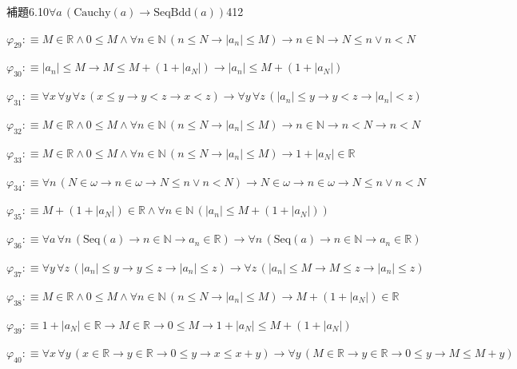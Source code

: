 \begin{fullproof}{補題6.10}{$\forall a\,(\mathrm{Cauchy}(a) \to \mathrm{SeqBdd}(a))$}{412}
\begin{abbrevlist}
\item $\varphi_{29} :\equiv M \in \mathbb{R} \land 0 \leq M \land \forall n \in \mathbb{N}\,(n \leq N \to \lvert a_{n} \rvert \leq M) \to n \in \mathbb{N} \to N \leq n \lor n < N$
\item $\varphi_{30} :\equiv \lvert a_{n} \rvert \leq M \to M \leq M + (1 + \lvert a_{N} \rvert) \to \lvert a_{n} \rvert \leq M + (1 + \lvert a_{N} \rvert)$
\item $\varphi_{31} :\equiv \forall x\,\forall y\,\forall z\,(x \leq y \to y < z \to x < z) \to \forall y\,\forall z\,(\lvert a_{n} \rvert \leq y \to y < z \to \lvert a_{n} \rvert < z)$
\item $\varphi_{32} :\equiv M \in \mathbb{R} \land 0 \leq M \land \forall n \in \mathbb{N}\,(n \leq N \to \lvert a_{n} \rvert \leq M) \to n \in \mathbb{N} \to n < N \to n < N$
\item $\varphi_{33} :\equiv M \in \mathbb{R} \land 0 \leq M \land \forall n \in \mathbb{N}\,(n \leq N \to \lvert a_{n} \rvert \leq M) \to 1 + \lvert a_{N} \rvert \in \mathbb{R}$
\item $\varphi_{34} :\equiv \forall n\,(N \in \omega \to n \in \omega \to N \leq n \lor n < N) \to N \in \omega \to n \in \omega \to N \leq n \lor n < N$
\item $\varphi_{35} :\equiv M + (1 + \lvert a_{N} \rvert) \in \mathbb{R} \land \forall n \in \mathbb{N}\,(\lvert a_{n} \rvert \leq M + (1 + \lvert a_{N} \rvert))$
\item $\varphi_{36} :\equiv \forall a\,\forall n\,(\mathrm{Seq}(a) \to n \in \mathbb{N} \to a_{n} \in \mathbb{R}) \to \forall n\,(\mathrm{Seq}(a) \to n \in \mathbb{N} \to a_{n} \in \mathbb{R})$
\item $\varphi_{37} :\equiv \forall y\,\forall z\,(\lvert a_{n} \rvert \leq y \to y \leq z \to \lvert a_{n} \rvert \leq z) \to \forall z\,(\lvert a_{n} \rvert \leq M \to M \leq z \to \lvert a_{n} \rvert \leq z)$
\item $\varphi_{38} :\equiv M \in \mathbb{R} \land 0 \leq M \land \forall n \in \mathbb{N}\,(n \leq N \to \lvert a_{n} \rvert \leq M) \to M + (1 + \lvert a_{N} \rvert) \in \mathbb{R}$
\item $\varphi_{39} :\equiv 1 + \lvert a_{N} \rvert \in \mathbb{R} \to M \in \mathbb{R} \to 0 \leq M \to 1 + \lvert a_{N} \rvert \leq M + (1 + \lvert a_{N} \rvert)$
\item $\varphi_{40} :\equiv \forall x\,\forall y\,(x \in \mathbb{R} \to y \in \mathbb{R} \to 0 \leq y \to x \leq x + y) \to \forall y\,(M \in \mathbb{R} \to y \in \mathbb{R} \to 0 \leq y \to M \leq M + y)$

\end{abbrevlist}
\end{fullproof}
